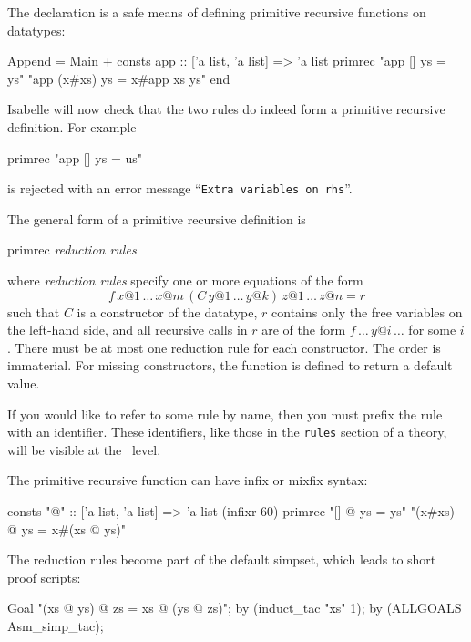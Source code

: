 The  declaration is a safe means of defining primitive
recursive functions on datatypes:
\begin{ttbox}
Append = Main +
consts app :: ['a list, 'a list] => 'a list
primrec
   "app [] ys = ys"
   "app (x#xs) ys = x#app xs ys"
end
\end{ttbox}
Isabelle will now check that the two rules do indeed form a primitive
recursive definition.  For example
\begin{ttbox}
primrec
    "app [] ys = us"
\end{ttbox}
is rejected with an error message ``\texttt{Extra variables on rhs}''.

\bigskip

The general form of a primitive recursive definition is
\begin{ttbox}
primrec
    {\it reduction rules}
\end{ttbox}
where \textit{reduction rules} specify one or more equations of the form
\[ f \, x@1 \, \dots \, x@m \, (C \, y@1 \, \dots \, y@k) \, z@1 \,
\dots \, z@n = r \] such that $C$ is a constructor of the datatype, $r$
contains only the free variables on the left-hand side, and all recursive
calls in $r$ are of the form $f \, \dots \, y@i \, \dots$ for some $i$.  There
must be at most one reduction rule for each constructor.  The order is
immaterial.  For missing constructors, the function is defined to return a
default value.  

If you would like to refer to some rule by name, then you must prefix
the rule with an identifier.  These identifiers, like those in the
\texttt{rules} section of a theory, will be visible at the \ML\ level.

The primitive recursive function can have infix or mixfix syntax:
\begin{ttbox}\underscoreon
consts "@"  :: ['a list, 'a list] => 'a list  (infixr 60)
primrec
   "[] @ ys = ys"
   "(x#xs) @ ys = x#(xs @ ys)"
\end{ttbox}

The reduction rules become part of the default simpset, which
leads to short proof scripts:
\begin{ttbox}\underscoreon
Goal "(xs @ ys) @ zs = xs @ (ys @ zs)";
by (induct\_tac "xs" 1);
by (ALLGOALS Asm\_simp\_tac);
\end{ttbox}


